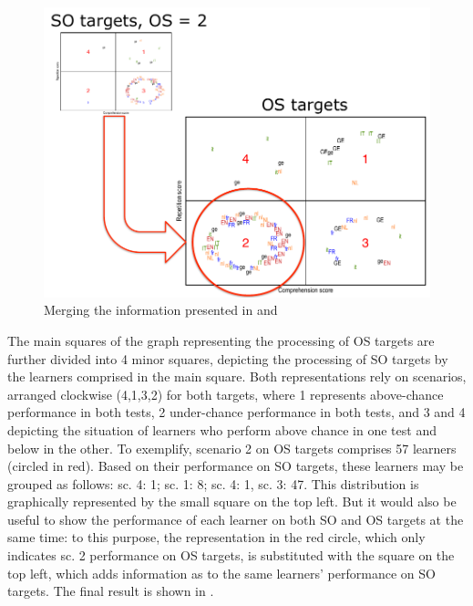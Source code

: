 \begin{figure}
    \includegraphics[width=\textwidth]{figures/06-4.pdf}
    \caption{Merging the information presented in  and }
    \label{fig:06:4}
\end{figure}

The main squares of the graph representing the processing of OS targets are further divided into 4 minor squares, depicting the processing of SO targets by the learners comprised in the main square. Both representations rely on scenarios, arranged clockwise (4,1,3,2) for both targets, where 1 represents above-chance performance in both tests, 2 under-chance performance in both tests, and 3 and 4 depicting the situation of learners who perform above chance in one test and below in the other. To exemplify, scenario 2 on OS targets comprises 57 learners (circled in red). Based on their performance on SO targets, these learners may be grouped as follows: sc. 4: 1; sc. 1: 8; sc. 4: 1, sc. 3: 47. This distribution is graphically represented by the small square on the top left. But it would also be useful to show the performance of each learner on both SO and OS targets at the same time: to this purpose, the representation in the red circle, which only indicates sc. 2 performance on OS targets, is substituted with the square on the top left, which adds information as to the same learners’ performance on SO targets. The final result is shown in .

